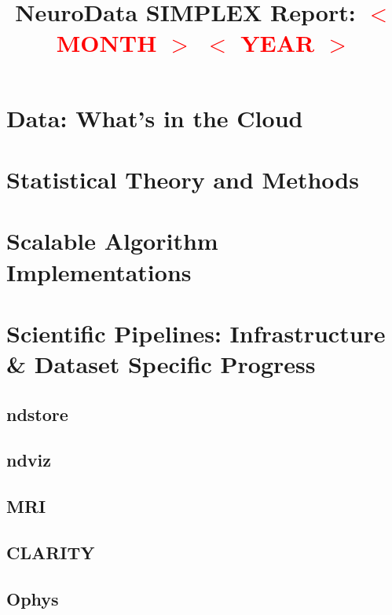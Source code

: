 \documentclass[12pt]{article}
\title{NeuroData SIMPLEX Report:\textcolor{red}{ $<$ MONTH $>$ $<$ YEAR
    $>$}}
\begin{document}

\newpage


\section{Data: What's in the Cloud}

\section{Statistical Theory and Methods}


\section{Scalable Algorithm Implementations}


\section{Scientific Pipelines: Infrastructure \& Dataset Specific
  Progress}

\subsection{ndstore}
\subsection{ndviz}
\subsection{MRI}
\subsection{CLARITY}
\subsection{Ophys}






\end{document}
